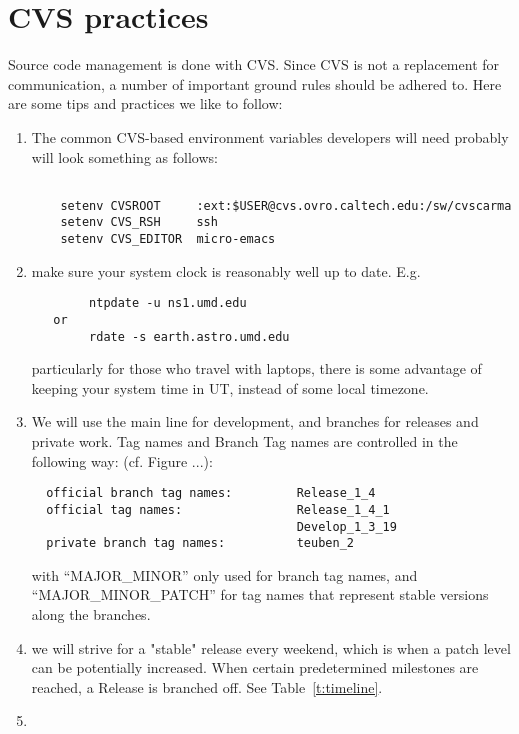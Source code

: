 \documentclass{article}
\begin{document}
\newpage

\section{CVS practices}

Source code management is done with CVS.  
Since CVS is not a replacement
for communication, a number of important ground rules should be adhered
to. Here are some tips and practices we like to follow:

\begin{enumerate}
\item
The common CVS-based environment variables developers will need 
probably will look something as follows:

\footnotesize \begin{verbatim}

	setenv CVSROOT     :ext:$USER@cvs.ovro.caltech.edu:/sw/cvscarma
	setenv CVS_RSH     ssh
	setenv CVS_EDITOR  micro-emacs
\end{verbatim}  \normalsize   %

\item
make sure your system clock is reasonably well up to date.  E.g.
\footnotesize \begin{verbatim}
        ntpdate -u ns1.umd.edu
   or
        rdate -s earth.astro.umd.edu
\end{verbatim} \normalsize
particularly for those who travel with laptops, there is some advantage
of keeping your system time in UT, instead of some local timezone.
\item
We will use the main line for development, and branches for releases and private
work. Tag names and Branch Tag names are controlled in the following way:
 (cf. Figure ...):

\begin{verbatim}
  official branch tag names:         Release_1_4
  official tag names:                Release_1_4_1     
                                     Develop_1_3_19
  private branch tag names:          teuben_2         
\end{verbatim}
with ``MAJOR\_MINOR'' only used for branch tag names, and 
``MAJOR\_MINOR\_PATCH''  for tag names that represent stable versions
along the branches.

\item
we will strive for a "stable" release every weekend, which is when a patch level
can be potentially increased. When certain predetermined milestones are reached,
a Release is branched off. See Table~\ref{t:timeline}.

\item

\end{enumerate}
\end{document}
